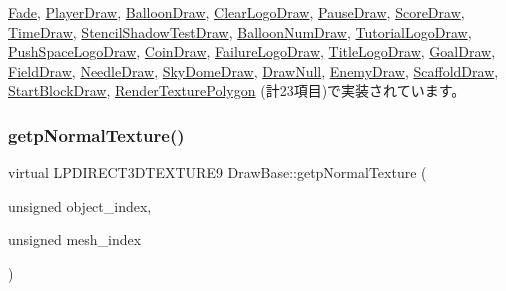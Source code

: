 \mbox{\hyperlink{class_fade_a468f87b671026f883443d6cdceeb95c6}{Fade}}, \mbox{\hyperlink{class_player_draw_a334e94f368f6bd571da866d69333f313}{Player\+Draw}}, \mbox{\hyperlink{class_balloon_draw_ab98a9333dcdf57c0ede287444b7cbabb}{Balloon\+Draw}}, \mbox{\hyperlink{class_clear_logo_draw_abcbd0cd8663e0262bcdd83356516082b}{Clear\+Logo\+Draw}}, \mbox{\hyperlink{class_pause_draw_a36622378926e01e7a401b6e201cb4f16}{Pause\+Draw}}, \mbox{\hyperlink{class_score_draw_adb995c83624c2eab8b8a15d1182df5b8}{Score\+Draw}}, \mbox{\hyperlink{class_time_draw_a3624fef571681cf4861891aa073338a0}{Time\+Draw}}, \mbox{\hyperlink{class_stencil_shadow_test_draw_a8ab105b75d673adc52698a8401c6525c}{Stencil\+Shadow\+Test\+Draw}}, \mbox{\hyperlink{class_balloon_num_draw_a9a337ac248ebb73dc32ef407221a6478}{Balloon\+Num\+Draw}}, \mbox{\hyperlink{class_tutorial_logo_draw_aade531190180c385c266f5698f99735d}{Tutorial\+Logo\+Draw}}, \mbox{\hyperlink{class_push_space_logo_draw_a9e0875967651293ef97713477334bc2e}{Push\+Space\+Logo\+Draw}}, \mbox{\hyperlink{class_coin_draw_ad8cbbe87f4cf4428214f50492c731f5f}{Coin\+Draw}}, \mbox{\hyperlink{class_failure_logo_draw_a6e6fb80dc21af9318d659bc3fa71c0b5}{Failure\+Logo\+Draw}}, \mbox{\hyperlink{class_title_logo_draw_a34fa4366f1ff190a08a36f8e402f6941}{Title\+Logo\+Draw}}, \mbox{\hyperlink{class_goal_draw_a536a23c043576f9032e6651d7644d038}{Goal\+Draw}}, \mbox{\hyperlink{class_field_draw_ad399978201f737f4c0dd2b3990fa6b34}{Field\+Draw}}, \mbox{\hyperlink{class_needle_draw_a7ae74f52a190793745b5339a6be559d7}{Needle\+Draw}}, \mbox{\hyperlink{class_sky_dome_draw_accbc05d1bbde9ad9d6b7180d91e9ed89}{Sky\+Dome\+Draw}}, \mbox{\hyperlink{class_draw_null_a9aac059eb3b5d1f77e8bd3aa0647cff9}{Draw\+Null}}, \mbox{\hyperlink{class_enemy_draw_afbb8ac19041abda280ece7737103dc66}{Enemy\+Draw}}, \mbox{\hyperlink{class_scaffold_draw_a337aafb07b51a215f7f25ab67202b102}{Scaffold\+Draw}}, \mbox{\hyperlink{class_start_block_draw_a062b7069d21ec07630f6c8aeea532401}{Start\+Block\+Draw}}, \mbox{\hyperlink{class_render_texture_polygon_a76ab48dff0a23ee4db47da598f4d6a70}{Render\+Texture\+Polygon}} (計23項目)で実装されています。

\mbox{\label{class_draw_base_a76c3b910b495fcf69aacf6164ca90c7d}} 
\subsubsection{\texorpdfstring{getp\+Normal\+Texture()}{getpNormalTexture()}}
{\footnotesize\ttfamily virtual L\+P\+D\+I\+R\+E\+C\+T3\+D\+T\+E\+X\+T\+U\+R\+E9 Draw\+Base\+::getp\+Normal\+Texture (\begin{DoxyParamCaption}\item[{unsigned}]{object\+\_\+index,  }\item[{unsigned}]{mesh\+\_\+index }\end{DoxyParamCaption})\hspace{0.3cm}{\ttfamily [pure virtual]}}



